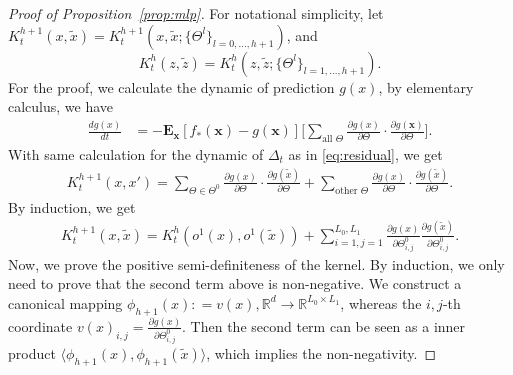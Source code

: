 \documentclass[11pt]{article}
\numberwithin{equation}{section}
\def\bd#1{\mathbf{#1}}
\def\bx{\bd{x}}
\begin{document}
\begin{proof}[Proof of Proposition~\ref{prop:mlp}]
For notational simplicity, let $K_t^{h+1}(x,\tilde x) = K_t^{h+1}(x,\tilde x;\{\Theta^{l}\}_{l=0,\dots,h+1})$, and $$K_t^{h}(z,\tilde z) = K_t^{h}(z,\tilde z;\{\Theta^{l}\}_{l=1,\dots,h+1}).$$ For the proof, we calculate the dynamic of prediction $g(x)$, by elementary calculus, we have
	\begin{align}
		\frac{dg(x)}{dt} &= -\mathbf{E}_{\bx}[f_*(\bx) - g(\bx)] \Big[ \sum_{\text{all }\Theta}\frac{\partial g(x)}{\partial \Theta}\cdot\frac{\partial g(\bx)}{\partial\Theta}\Big].
	\end{align}
	With same calculation for the dynamic of $\Delta_t$ as in \eqref{eq:residual}, we get
	\begin{align}
		K_t^{h+1}(x,x') =  \sum_{\Theta \in \Theta^0}\frac{\partial g(x)}{\partial \Theta}\cdot\frac{\partial g(\tilde x)}{\partial \Theta} + \sum_{\text{other }\Theta}\frac{\partial g(x)}{\partial \Theta}\cdot\frac{\partial g(\tilde x)}{\partial \Theta}.
	\end{align}
	By induction, we get
	\begin{align}
	K_t^{h+1}(x,\tilde x) = K_t^{h}(o^1(x),o^1(\tilde x)) +  \sum_{i=1,j=1}^{L_0,L_1}\frac{\partial g(x)}{\partial \Theta^0_{i,j}}\frac{\partial g(\tilde x)}{\partial \Theta^0_{i,j}}.
	\end{align}
Now, we prove the positive semi-definiteness of the kernel. By induction, we only need to prove that the second term above is non-negative. We construct a canonical mapping $\phi_{h+1}(x): = v(x), \mathbb{R}^d \rightarrow \mathbb{R}^{L_0 \times L_1}$, whereas the $i,j$-th coordinate $v(x)_{i,j} = \frac{\partial g(x)}{\partial \Theta^0_{i,j}}$. Then the second term can be seen as a inner product $\langle \phi_{h+1}(x),\phi_{h+1}(\tilde x)\rangle$, which implies the non-negativity. 
\end{proof}
\end{document}
